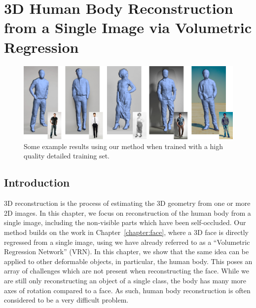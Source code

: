 \graphicspath{{chapter_humans/}}
\chapter{3D Human Body Reconstruction from a Single Image via
  Volumetric Regression}
\label{chapter:human}



\begin{figure}[h!]
  \centering
  \includegraphics[width=\linewidth]{img/demo.png}
  \caption[Example reconstructions]{Some example results using our
    method when trained with a high quality detailed training set.}
  \label{fig:topdemo}
\end{figure}


\section{Introduction}


3D reconstruction is the process of estimating the 3D geometry from
one or more 2D images. In this chapter, we focus on reconstruction of the
human body from a single image, including the non-visible parts which
have been self-occluded. Our method builds on the work in
Chapter~\ref{chapter:face}, where a 3D face is directly regressed from
a single image, using we have already referred to as a ``Volumetric
Regression Network'' (VRN). In this chapter, we show that the same
idea can be applied to other deformable objects, in particular, the
human body. This poses an array of challenges which are not present
when reconstructing the face. While we are still only reconstructing
an object of a single class, the body has many more axes of rotation
compared to a face. As such, human body reconstruction is often
considered to be a very difficult problem.

